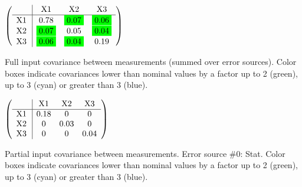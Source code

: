\begin{table}[H]
\scriptsize
\begin{center}
\renewcommand{\arraystretch}{1.1}
\begin{math}\left(\begin{array}{c|ccc}
 & \mathrm{X1} & 
\mathrm{X2} & 
\mathrm{X3} \\
\hline
\mathrm{X1} \hspace*{2pt} &       0.78 &  \colorbox{Green1}{$      0.07$} &  \colorbox{Green1}{$      0.06$} \\
\mathrm{X2} \hspace*{2pt} &  \colorbox{Green1}{$      0.07$} &       0.05 &  \colorbox{Green1}{$      0.04$} \\
\mathrm{X3} \hspace*{2pt} &  \colorbox{Green1}{$      0.06$} &  \colorbox{Green1}{$      0.04$} &       0.19 \\
\end{array}\right)\end{math}
\caption{Full input covariance between measurements (summed over error sources). Color boxes indicate covariances lower than nominal values by a factor up to 2 (green), up to 3 (cyan) or greater than 3 (blue).}
\renewcommand{\arraystretch}{1}
\end{center}
\end{table}
\begin{table}[H]
\scriptsize
\begin{center}
\renewcommand{\arraystretch}{1.1}
\begin{math}\left(\begin{array}{c|ccc}
 & \mathrm{X1} & 
\mathrm{X2} & 
\mathrm{X3} \\
\hline
\mathrm{X1} \hspace*{2pt} &       0.18 &  0 &  0 \\
\mathrm{X2} \hspace*{2pt} &  0 &       0.03 &  0 \\
\mathrm{X3} \hspace*{2pt} &  0 &  0 &       0.04 \\
\end{array}\right)\end{math}
\caption{Partial input covariance between measurements. Error source \#0: Stat. Color boxes indicate covariances lower than nominal values by a factor up to 2 (green), up to 3 (cyan) or greater than 3 (blue).}
\renewcommand{\arraystretch}{1}
\end{center}
\end{table}
